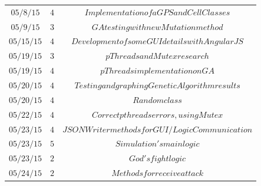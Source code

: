 \documentclass[twocolumn]{IEEEtran}
\begin{document}
\begin{table}[h!]
\begin{tabular}{c c c}
{$05/8/15$}&{$4$}&{$Implementation of a GPS and Cell Classes$}\\
{$05/9/15$}&{$3$}&{$GA testing with new Mutation method$}\\
{$05/15/15$}&{$4$}&{$Development of some GUI details with AngularJS$}\\
{$05/19/15$}&{$3$}&{$pThreads and Mutex research$}\\
{$05/19/15$}&{$4$}&{$pThreads implementation on GA$}\\
{$05/20/15$}&{$4$}&{$Testing and graphing Genetic Algorithm results$}\\
{$05/20/15$}&{$4$}&{$Random class$}\\
{$05/22/15$}&{$4$}&{$Correct pthreads errors, using Mutex$}\\
{$05/23/15$}&{$4$}&{$JSON Writer methods for GUI/Logic Communication$}\\
{$05/23/15$}&{$5$}&{$Simulation's main logic$}\\
{$05/23/15$}&{$2$}&{$God's fight logic$}\\
{$05/24/15$}&{$2$}&{$Methods for receive attack$}\\





\end{tabular}
\end{table}
\end{document}
